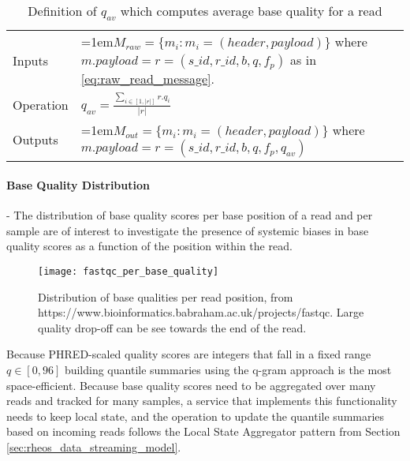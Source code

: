 \bgroup
\def\arraystretch{1.5}
\begin{table}[!ht]
    \caption{Definition of $q_{av}$ which computes average base quality for a read}
    \label{tab:op_average_base_quality}
    {\begin{tabular}{l|p{12cm}}
    \toprule
    Inputs & \hangindent=1em$M_{raw} = \{m_i: m_i = (header, payload)\}$ where $m.payload = r = (s\_id, r\_id, b, q, f_p)$ as in \ref{eq:raw_read_message}.\\
    \cline{2-2}
    Operation & $q_{av} = \frac{\sum_{i \in [1,|r|]} r.q_i}{|r|}$\\
    \cline{2-2}
    {Outputs} & \hangindent=1em$M_{out} = \{m_i: m_i = (header, payload)\}$ where $m.payload = r = (s\_id, r\_id, b, q, f_p, q_{av})$\\
    \bottomrule
    \end{tabular}}
\end{table}
\egroup


\paragraph{Base Quality Distribution} - The distribution of base quality scores per base position of a read and per sample are of interest to investigate the presence of systemic biases in base quality scores as a function of the position within the read.

\begin{figure}[H]
    \texttt{[image: fastqc\_per\_base\_quality]}
    \centering
    \caption {Distribution of base qualities per read position, from https://www.bioinformatics.babraham.ac.uk/projects/fastqc. Large quality drop-off can be see towards the end of the read.}
    \label{fig:main_body_fastqc_per_base_quality}
\end{figure} 

Because PHRED-scaled quality scores are integers that fall in a fixed range $q \in [0,96]$ building quantile summaries using the q-gram\autocite{shrivastava2004medians} approach is the most space-efficient. Because base quality scores need to be aggregated over many reads and tracked for many samples, a service that implements this functionality needs to keep local state, and the operation to update the quantile summaries based on incoming reads follows the Local State Aggregator pattern from Section \ref{sec:rheos_data_streaming_model}. 

